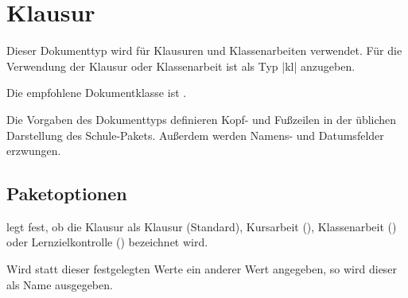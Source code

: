 \section{Klausur}
\label{typ:kl}
Dieser Dokumenttyp wird für Klausuren und Klassenarbeiten verwendet. Für die Verwendung der Klausur oder Klassenarbeit ist als Typ \verbcode|kl| anzugeben.

Die empfohlene Dokumentklasse ist .

Die Vorgaben des Dokumenttyps definieren Kopf- und Fußzeilen in der üblichen Darstellung des Schule-Pakets. Außerdem werden Namens- und Datumsfelder erzwungen.

\subsection{Paketoptionen}
\begin{options}
        legt fest, ob die Klausur als Klausur (Standard), Kursarbeit (), Klassenarbeit () oder Lernzielkontrolle () bezeichnet wird.

        Wird statt dieser festgelegten Werte ein anderer Wert angegeben, so wird dieser als Name ausgegeben. 
\end{options}

%
%
